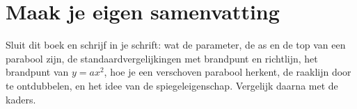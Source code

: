 
\ifzelfstudie
\section*{Maak je eigen samenvatting}
Sluit dit boek en schrijf in je schrift: wat de parameter, de as en de top van een parabool zijn, de standaardvergelijkingen met brandpunt en richtlijn, het brandpunt van $y = ax^2$, hoe je een verschoven parabool herkent, de raaklijn door te ontdubbelen, en het idee van de spiegeleigenschap. Vergelijk daarna met de kaders.
\fi

